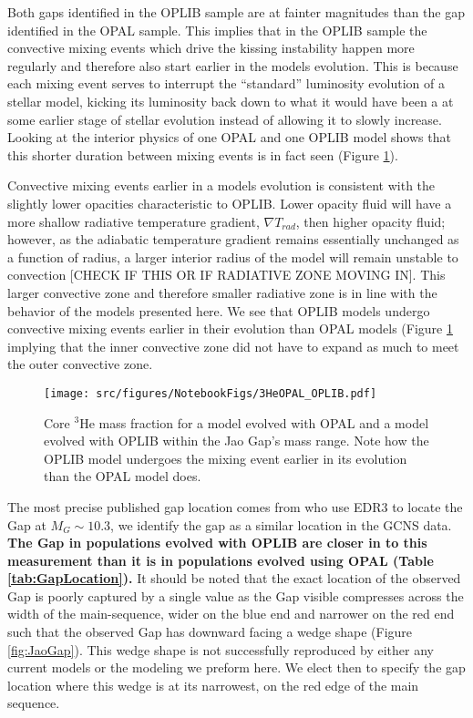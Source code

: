 Both gaps identified in the OPLIB sample are at fainter magnitudes than the gap
identified in the OPAL sample. This implies that in the OPLIB sample the
convective mixing events which drive the kissing instability happen more
regularly and therefore also start earlier in the models evolution. This is
because each mixing event serves to interrupt the ``standard'' luminosity
evolution of a stellar model, kicking its luminosity back down to what it would
have been a at some earlier stage of stellar evolution instead of allowing it
to slowly increase. Looking at the interior physics of one OPAL and one OPLIB
model shows that this shorter duration between mixing events is in fact seen
(Figure \ref{fig:OPALOPLIB3He}).

Convective mixing events earlier in a models evolution is consistent with the
slightly lower opacities characteristic to OPLIB. Lower opacity fluid will have
a more shallow radiative temperature gradient, $\nabla T_{rad}$, then higher
opacity fluid; however, as the adiabatic temperature gradient remains
essentially unchanged as a function of radius, a larger interior radius of the
model will remain unstable to convection {\color{red}[CHECK IF THIS OR IF
RADIATIVE ZONE MOVING IN]}. This larger convective zone and therefore smaller
radiative zone is in line with the behavior of the models presented here. We see
that OPLIB models undergo convective mixing events earlier in their evolution
than OPAL models (Figure \ref{fig:OPALOPLIB3He} implying that the inner
convective zone did not have to expand as much to meet the outer convective
zone. 

\begin{figure}
	\centering
	\texttt{[image: src/figures/NotebookFigs/3HeOPAL\_OPLIB.pdf]}
	\caption{Core $^{3}$He mass fraction for a model evolved with OPAL and a
	model evolved with OPLIB within the Jao Gap's mass range. Note how the
	OPLIB model undergoes the mixing event earlier in its evolution than the
	OPAL model does.}
	\label{fig:OPALOPLIB3He}
\end{figure}

The most precise published gap location comes from \citet{Jao2020} who use EDR3
to locate the Gap at $M_{G} \sim 10.3$, we identify the gap as a similar
location in the GCNS data. \textbf{The Gap in populations evolved with OPLIB
are closer in to this measurement than it is in populations evolved using OPAL
(Table \ref{tab:GapLocation}).} It should be noted that the exact location of
the observed Gap is poorly captured by a single value as the Gap visible
compresses across the width of the main-sequence, wider on the blue end and
narrower on the red end such that the observed Gap has downward facing a wedge
shape (Figure \ref{fig:JaoGap}). This wedge shape is not successfully
reproduced by either any current models or the modeling we preform here. We
elect then to specify the gap location where this wedge is at its narrowest, on
the red edge of the main sequence.

